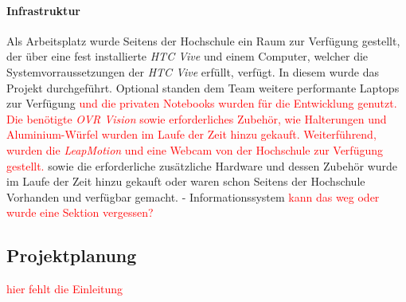 \paragraph{Infrastruktur} Als Arbeitsplatz wurde Seitens der Hochschule ein Raum zur Verfügung gestellt, der über eine fest installierte \textit{HTC Vive} und einem Computer, welcher die Systemvorraussetzungen der \textit{HTC Vive} erfüllt, verfügt. In diesem wurde das Projekt durchgeführt. Optional standen dem Team weitere performante Laptops zur Verfügung \textcolor{red}{und die privaten Notebooks wurden für die Entwicklung genutzt. Die benötigte \textit{OVR Vision} sowie erforderliches Zubehör, wie Halterungen und Aluminium-Würfel wurden im Laufe der Zeit hinzu gekauft. Weiterführend, wurden die \textit {LeapMotion} und eine Webcam von der Hochschule zur Verfügung gestellt.} sowie die erforderliche zusätzliche Hardware und dessen Zubehör wurde im Laufe der Zeit hinzu gekauft oder waren schon Seitens der Hochschule Vorhanden und verfügbar gemacht.
- Informationssystem \textcolor{red}{kann das weg oder wurde eine Sektion vergessen?}

\subsection{Projektplanung}
\textcolor{red}{hier fehlt die Einleitung}
